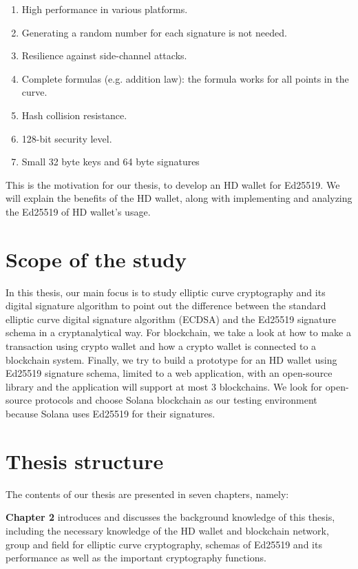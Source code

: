 \begin{enumerate}
    \item High performance in various platforms.
    \item Generating a random number for each signature is not needed.
    \item Resilience against side-channel attacks.
    \item Complete formulas (e.g. addition law): the formula works for all points in the curve.
    \item Hash collision resistance.
    \item 128-bit security level.
    \item Small 32 byte keys and 64 byte signatures
\end{enumerate}
This is the motivation for our thesis, to develop an HD wallet for Ed25519. We will explain the benefits of the HD wallet, along with implementing and analyzing the Ed25519 of HD wallet’s usage. 

\section{Scope of the study}

In this thesis, our main focus is to study elliptic curve cryptography and its digital signature algorithm to point out the difference between the standard elliptic curve digital signature algorithm (ECDSA) and the Ed25519 signature schema in a cryptanalytical way. For blockchain, we take a look at how to make a transaction using crypto wallet and how a crypto wallet is connected to a blockchain system. Finally, we try to build a prototype for an HD wallet using Ed25519 signature schema, limited to a web application, with an open-source library and the application will support at most 3 blockchains. We look for open-source protocols and choose Solana blockchain as our testing environment because Solana uses Ed25519 for their signatures.

\section{Thesis structure}

The contents of our thesis are presented in seven chapters, namely:

\textbf{Chapter 2} introduces and discusses the background knowledge of this thesis, including the necessary knowledge of the HD wallet and blockchain network, group and field for elliptic curve cryptography, schemas of Ed25519 and its performance as well as the important cryptography functions.

